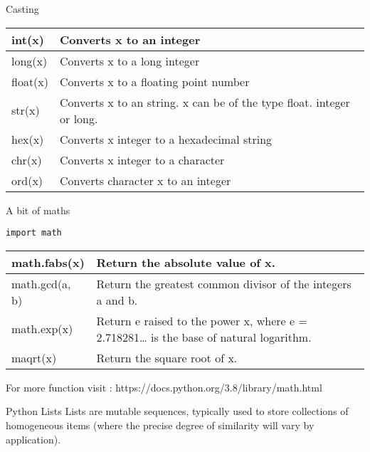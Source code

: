 \documentclass{beamer}
\begin{document}
\begin{frame}{Casting}
	\begin{center}
	\begin{table}
		\begin{tabular}{|l|p{8cm}|}
		\hline
		int(x) & Converts x to an integer \\
		\hline
		long(x) & Converts x to a long integer \\
		\hline
		float(x) & Converts x to a floating point number \\
		\hline
		str(x) & Converts x to an string. x can be of the type float. integer or long. \\
		\hline
		hex(x) & Converts x integer to a hexadecimal string \\
		\hline
		chr(x) & Converts x integer to a character \\
		\hline
		ord(x) & Converts character x to an integer \\
		\hline
	\end{tabular}
	\end{table}
	\end{center}
\end{frame}

\begin{frame}[fragile]{A bit of maths}
	\begin{verbatim}
import math
	\end{verbatim}
	
	\begin{center}
	\begin{table}
	\begin{tabular}{|l|p{7cm}|}
		\hline
		math.fabs(x) &
		Return the absolute value of x. \\
		\hline
		math.gcd(a, b) &
		Return the greatest common divisor of the integers a and b. \\
		\hline
		math.exp(x) &
		Return e raised to the power x, where e = 2.718281… is the base of natural logarithm. \\
		\hline
		maqrt(x) & 
		Return the square root of x. \\
		\hline
	\end{tabular}
	\end{table}
	\end{center}
	For more function visit : 
	https://docs.python.org/3.8/library/math.html
\end{frame}

\begin{frame}{Python Lists}
	Lists are mutable sequences, typically used to store collections of homogeneous items (where the precise degree of similarity will vary by application).
\end{frame}
\end{document}
